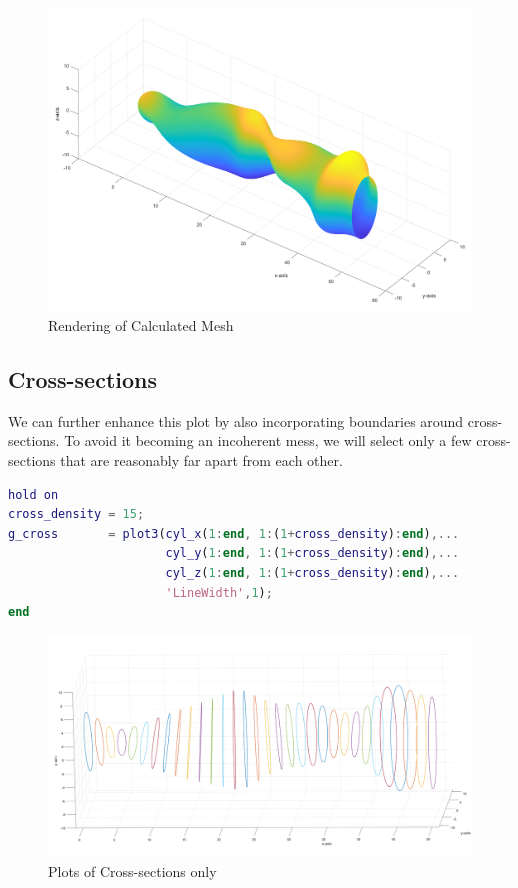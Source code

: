 \documentclass[a4paper]{article}
\begin{document}
\begin{figure}[h]
    \centering
    \includegraphics[width=1\linewidth]{Images/Uncharted_Tunnel.png}
    \caption{Rendering of Calculated Mesh}
    \label{Channel with cross-sections}
\end{figure}
\hypertarget{the-plot}{%
\subsection{Cross-sections}\label{the-plot}}

We can further enhance this plot by also incorporating boundaries around cross-sections. To avoid it becoming an incoherent mess, we will select only a few cross-sections that are reasonably far apart from each other.

\begin{lstlisting}[language=matlab]
hold on
cross_density = 15;
g_cross       = plot3(cyl_x(1:end, 1:(1+cross_density):end),...
                      cyl_y(1:end, 1:(1+cross_density):end),...
                      cyl_z(1:end, 1:(1+cross_density):end),...
                      'LineWidth',1);
end
\end{lstlisting}
\pagebreak
\begin{figure}[h]
    \centering
    \includegraphics[width=0.8\linewidth]{Images/Skeleton.png}
    \caption{Plots of Cross-sections only}
    \label{fig:enter-label}
\end{figure}
\end{document}
